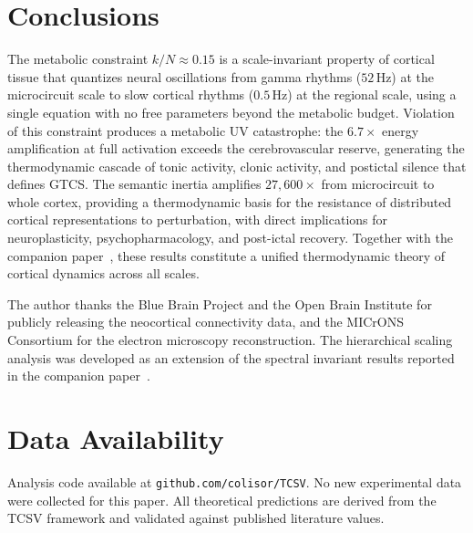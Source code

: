 \documentclass[aps,pre,twocolumn,showpacs,superscriptaddress,longbibliography]{revtex4-2}
\newcommand{\kN}{k/N}
\begin{document}
\section{\label{sec:conclusions}Conclusions}

The metabolic constraint $\kN \approx 0.15$ is a scale-invariant
property of cortical tissue that quantizes neural oscillations
from gamma rhythms ($52\,\mathrm{Hz}$) at the microcircuit
scale to slow cortical rhythms ($0.5\,\mathrm{Hz}$) at the
regional scale, using a single equation with no free parameters
beyond the metabolic budget. Violation of this constraint
produces a metabolic UV catastrophe: the $6.7\times$ energy
amplification at full activation exceeds the cerebrovascular
reserve, generating the thermodynamic cascade of tonic activity,
clonic activity, and postictal silence that defines GTCS.
The semantic inertia amplifies $27{,}600\times$ from microcircuit
to whole cortex, providing a thermodynamic basis for the
resistance of distributed cortical representations to
perturbation, with direct implications for neuroplasticity,
psychopharmacology, and post-ictal recovery. Together with the
companion paper~\cite{Santos2025a}, these results constitute a
unified thermodynamic theory of cortical dynamics across all
scales.

\begin{acknowledgments}
The author thanks the Blue Brain Project and the Open Brain
Institute for publicly releasing the neocortical connectivity
data, and the MICrONS Consortium for the electron microscopy
reconstruction. The hierarchical scaling analysis was developed
as an extension of the spectral invariant results reported in
the companion paper~\cite{Santos2025a}.
\end{acknowledgments}

\section*{Data Availability}
Analysis code available at \texttt{github.com/colisor/TCSV}.
No new experimental data were collected for this paper.
All theoretical predictions are derived from the TCSV framework
and validated against published literature values.
\end{document}
